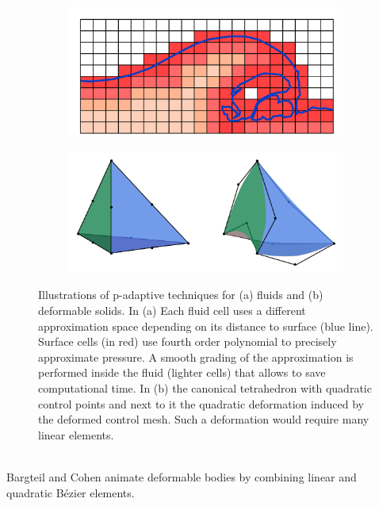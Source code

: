 \begin{figure}[t]
	\centering
	\begin{subfigure}[!ht]{0.48\linewidth}
		\centering
		\includegraphics[width=\linewidth]{images/starAdaptivity-cgf2016/pfluid.png}
		\caption{\label{fig:pfluid}}
	\end{subfigure}
	\hfill
	\begin{subfigure}[!ht]{0.48\linewidth}
		\centering
		\includegraphics[width=\linewidth]{images/starAdaptivity-cgf2016/quadratic.png}
		\caption{\label{fig:quadratic_fem}}
	\end{subfigure}
	\caption[STAR adaptivity: p-adaptive techniques]{\label{fig:padaptivity}
		Illustrations of p-adaptive techniques for (a) fluids and (b) deformable solids.
		In (a) Each fluid cell uses a different approximation space depending on its distance to surface (blue line). Surface cells (in red) use fourth order polynomial to precisely approximate pressure. A smooth grading of the approximation is performed inside the fluid (lighter cells) that allows to save computational time.
		In (b) the canonical tetrahedron with quadratic control points and next to it the quadratic deformation induced by the deformed control mesh. Such a deformation would require many linear elements.
	}
\end{figure}
\\
Bargteil and Cohen \cite{bargteil2014animation} animate deformable bodies by combining linear and quadratic B{\'e}zier elements.
